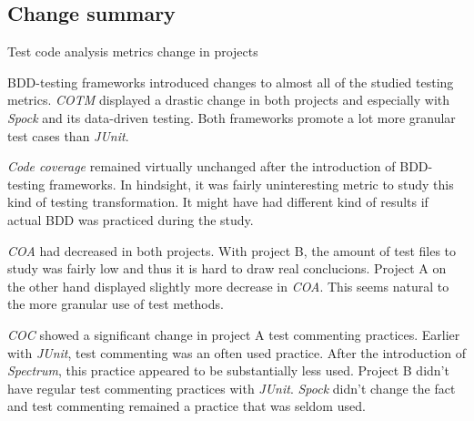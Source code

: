 \subsection{Change summary}

{\renewcommand{\arraystretch}{1.3}
\begin{table}[H]
        \caption {Test code analysis metrics change in projects} \label{tab:test-change}
        \caption*{+ = Increase amount, - = Decrease amount}
\end{table}
}

BDD-testing frameworks introduced changes to almost all of the studied testing metrics. \textit{COTM} displayed a drastic change
in both projects and especially with \textit{Spock} and its data-driven testing. Both frameworks promote a lot more granular
test cases than \textit{JUnit}.

\textit{Code coverage} remained virtually unchanged after the introduction of BDD-testing frameworks. In
hindsight, it was fairly uninteresting metric to study this kind of testing transformation. It might have had different
kind of results if actual BDD was practiced during the study.

\textit{COA} had decreased in both projects. With project B, the amount of test files to study was fairly low and thus it is
hard to draw real conclucions. Project A on the other hand displayed slightly more decrease in \textit{COA}. This seems natural
to the more granular use of test methods.

\textit{COC} showed a significant change in project A test commenting practices. Earlier with \textit{JUnit}, test commenting was an often
used practice. After the introduction of \textit{Spectrum}, this practice appeared to be substantially less used. Project B didn't
have regular test commenting practices with \textit{JUnit}. \textit{Spock} didn't change the fact and test commenting remained a practice
that was seldom used.

